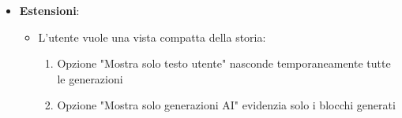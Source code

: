 \documentclass[11pt,a4paper]{article}
\begin{document}
\begin{itemize}
\begin{itemize}
\begin{enumerate}
                    \item La posizione relativa nel documento preserva il contesto temporale e logico
                \end{enumerate}
            \item L'utente può effettuare operazioni sulle generazioni:
                \begin{enumerate}
                    \item Modifica qualsiasi del testo generato
                    \item Eliminazione di singole generazioni
                    \item Ordinamento delle generazioni spostandole nel documento
                    \item Raggruppamento di generazioni correlate (es: tutte le traduzioni di un paragrafo)
                    \item Nascondere/mostrare intere sezioni di generazioni
                \end{enumerate}
        \end{itemize}
    \item \textbf{Estensioni}:
        \begin{itemize}
            \item L'utente vuole una vista compatta della storia:
                \begin{enumerate}
                    \item Opzione "Mostra solo testo utente" nasconde temporaneamente tutte le generazioni
                    \item Opzione "Mostra solo generazioni AI" evidenzia solo i blocchi generati
                \end{enumerate}
        \end{itemize}
\end{itemize}
\end{document}
